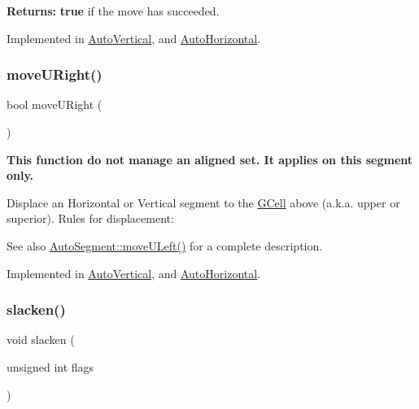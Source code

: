 {\bfseries Returns\+:} {\bfseries true} if the move has succeeded.

 

Implemented in \mbox{\hyperlink{classKatabatic_1_1AutoVertical_a1fa2421b74bf0eb934b7002fd3da2321}{Auto\+Vertical}}, and \mbox{\hyperlink{classKatabatic_1_1AutoHorizontal_a1fa2421b74bf0eb934b7002fd3da2321}{Auto\+Horizontal}}.

\mbox{\label{classKatabatic_1_1AutoSegment_ad7fd54ca229fcf5ccd99f87b019b9cbc}} 
\subsubsection{\texorpdfstring{move\+U\+Right()}{moveURight()}}
{\footnotesize\ttfamily bool move\+U\+Right (\begin{DoxyParamCaption}{ }\end{DoxyParamCaption})\hspace{0.3cm}{\ttfamily [pure virtual]}}

{\bfseries This function do not manage an aligned set. It applies on {\ttfamily this} segment only.}

Displace an Horizontal or Vertical segment to the \mbox{\hyperlink{classKatabatic_1_1GCell}{G\+Cell}} above (a.\+k.\+a. upper or superior). Rules for displacement\+:

\begin{DoxySeeAlso}{See also}
\mbox{\hyperlink{classKatabatic_1_1AutoSegment_af8ca7b17e952f4b599aeeb2f4e5be395}{Auto\+Segment\+::move\+U\+Left()}} for a complete description. 
\end{DoxySeeAlso}


Implemented in \mbox{\hyperlink{classKatabatic_1_1AutoVertical_aa469e37853e31f8b1bc817518c896d62}{Auto\+Vertical}}, and \mbox{\hyperlink{classKatabatic_1_1AutoHorizontal_aa469e37853e31f8b1bc817518c896d62}{Auto\+Horizontal}}.

\mbox{\label{classKatabatic_1_1AutoSegment_a1fbc0adb4c0b14632edc7c55f028cd4b}} 
\subsubsection{\texorpdfstring{slacken()}{slacken()}}
{\footnotesize\ttfamily void slacken (\begin{DoxyParamCaption}\item[{unsigned int}]{flags }\end{DoxyParamCaption})}

